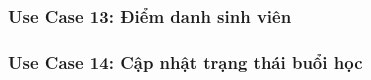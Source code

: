 \newpage
\subsubsection*{Use Case 13: Điểm danh sinh viên}
\begin{samepage}

\end{samepage}


\newpage
\subsubsection*{Use Case 14: Cập nhật trạng thái buổi học}
\begin{samepage}

\end{samepage}


